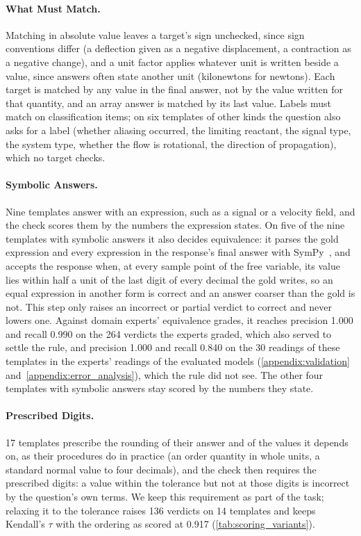 \paragraph{What Must Match.} Matching in absolute value leaves a target's sign unchecked, since sign
conventions differ (a deflection given as a negative displacement, a contraction as a negative
change), and a unit factor applies whatever unit is written beside a value, since answers often
state another unit (kilonewtons for newtons).
Each target is matched by any value in the final answer, not by the value written for that quantity,
and an array answer is matched by its last value.
Labels must match on classification items; on six templates of other kinds the question also asks
for a label (whether aliasing occurred, the limiting reactant, the signal type, the system type,
whether the flow is rotational, the direction of propagation), which no target checks.

\paragraph{Symbolic Answers.} Nine templates answer with an expression, such as a signal or a
velocity field, and the check scores them by the numbers the expression states.
On five of the nine templates with symbolic answers it also decides equivalence: it parses the gold
expression and every expression in the response's final answer with SymPy~\citep{meurer2017sympy},
and accepts the response when, at every sample point of the free variable, its value lies within
half a unit of the last digit of every decimal the gold writes, so an equal expression in another
form is correct and an answer coarser than the gold is not.
This step only raises an incorrect or partial verdict to correct and never lowers one.
Against domain experts' equivalence grades, it reaches precision 1.000 and recall 0.990 on the 264
verdicts the experts graded, which also served to settle the rule, and precision 1.000 and recall
0.840 on the 30 readings of these templates in the experts' readings of the evaluated models
(\autoref{appendix:validation} and~\autoref{appendix:error_analysis}), which the rule did not see.
The other four templates with symbolic answers stay scored by the numbers they state.

\paragraph{Prescribed Digits.} 17 templates prescribe the rounding of their answer and of the values
it depends on, as their procedures do in practice (an order quantity in whole units, a standard
normal value to four decimals), and the check then requires the prescribed digits: a value within
the tolerance but not at those digits is incorrect by the question's own terms.
We keep this requirement as part of the task; relaxing it to the tolerance raises 136 verdicts on 14
templates and keeps Kendall's $\tau$ with the ordering as scored at 0.917
(\autoref{tab:scoring_variants}).

